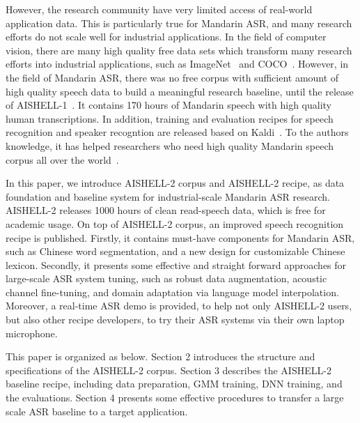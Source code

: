 \documentclass[a4paper]{article}
\begin{document}
However, the research community have very limited access of real-world
application data. This is particularly true for Mandarin ASR, and many research
efforts do not scale well for industrial applications. In the field of computer
vision, there are many high quality free data sets which transform many research
efforts into industrial applications, such as ImageNet~\cite{imagenet} and
COCO~\cite{coco}. However, in the field of Mandarin ASR, there was no free
corpus with sufficient amount of high quality speech data to build a meaningful
research baseline, until the release of AISHELL-1~\cite{aishell1}. It contains
170 hours of Mandarin speech with high quality human transcriptions. In
addition, training and evaluation recipes for speech recognition and speaker
recogntion are released based on Kaldi~\cite{kaldi}. To the authors knowledge,
it has helped researchers who need high quality Mandarin speech corpus all over
the world~\cite{do2017}.


In this paper, we introduce AISHELL-2 corpus and AISHELL-2 recipe, as data
foundation and baseline system for industrial-scale Mandarin ASR
research. AISHELL-2 releases 1000 hours of clean read-speech data, which is free
for academic usage. On top of AISHELL-2 corpus, an improved speech recognition
recipe is published. Firstly, it contains must-have components for Mandarin ASR,
such as Chinese word segmentation, and a new design for customizable Chinese
lexicon. Secondly, it presents some effective and straight forward approaches
for large-scale ASR system tuning, such as robust data augmentation, acoustic
channel fine-tuning, and domain adaptation via language model
interpolation. Moreover, a real-time ASR demo is provided, to help not only
AISHELL-2 users, but also other recipe developers, to try their ASR systems via
their own laptop microphone.

This paper is organized as below. Section 2 introduces the structure and
specifications of the AISHELL-2 corpus. Section 3 describes the AISHELL-2
baseline recipe, including data preparation, GMM training, DNN training, and the
evaluations. Section 4 presents some effective procedures to transfer a large
scale ASR baseline to a target application.
\end{document}
